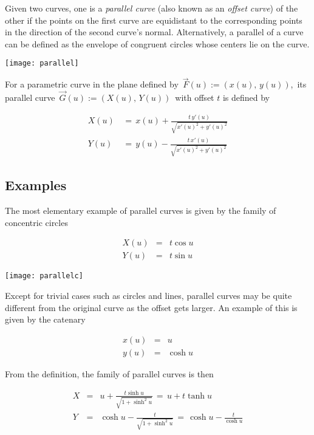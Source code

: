 \documentclass[12pt]{article}
\begin{document}
Given two curves, one is a \emph{parallel curve} (also known as an \emph{offset curve}) of the other if the points on the first curve are equidistant to the corresponding points in the direction of the second curve's normal. Alternatively, a parallel of a curve can be defined as the envelope of congruent circles whose centers lie on the curve.

\begin{center}
\texttt{[image: parallel]}
\end{center}

For a parametric curve in the plane defined by\, $\vec{F}(u) := (x(u),\,y(u))$,\, its parallel curve\, 
$\vec{G}(u) := (X(u),\,Y(u))$\, with offset $t$ is defined by

\begin{eqnarray*}
X(u)\,&=\, x(u)\!+\!\frac{t\,y'(u)}{\sqrt{x'(u)^2\!+y'(u)^2}}\\
Y(u)\,&=\, y(u)\!-\!\frac{t\,x'(u)}{\sqrt{x'(u)^2\!+y'(u)^2}}
\end{eqnarray*}

\subsection{Examples}

The most elementary example of parallel curves is given by the family of concentric circles

\begin{eqnarray*}
X(u) &=& t \cos u\\
Y(u) &=& t \sin u
\end{eqnarray*}

\begin{center}
\texttt{[image: parallelc]}
\end{center}

Except for trivial cases such as circles and lines, parallel curves may be quite different from the original curve as the offset gets larger. An example of this is given by the catenary

\begin{eqnarray*}
x(u) &=& u\\
y(u) &=& \cosh{u}
\end{eqnarray*}

From the definition, the family of parallel curves is then

\begin{eqnarray*}
X &=& u+\frac{t\sinh{u}}{\sqrt{1+\sinh^2{u}}}\,=\, u+t\tanh{u}\\
Y &=& \cosh{u}-\frac{t}{\sqrt{1+\sinh^2{u}}}\,=\, \cosh{u}-\frac{t}{\cosh{u}}
\end{eqnarray*}
\end{document}
